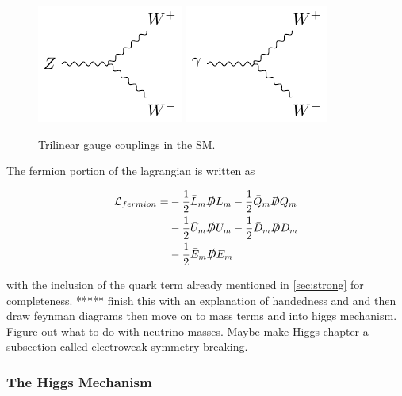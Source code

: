\begin{centering}
\begin{figure}[!hbt]
\myfloatalign
\includegraphics[width=.45\linewidth]{feynman/tlgc_z.pdf}
\includegraphics[width=.45\linewidth]{feynman/tlgc_g.pdf}
\caption{Trilinear gauge couplings in the \ac{SM}.}
\label{fig:tlgc}
\end{figure}
\end{centering}

The fermion portion of the lagrangian is written as

\begin{equation}
\begin{split}
\mathcal{L}_{fermion} = & -\frac{1}{2}\bar{L}_m\slashed{D}L_m -\frac{1}{2}\bar{Q}_m\slashed{D}Q_m \\
						& -\frac{1}{2}\bar{U}_m\slashed{D}U_m -\frac{1}{2}\bar{D}_m\slashed{D}D_m \\
						& -\frac{1}{2}\bar{E}_m\slashed{D}E_m \\
\end{split}
\end{equation}

with the inclusion of the quark term already mentioned in \autoref{sec:strong} for completeness. 
***** finish this with an explanation of handedness and and then draw feynman diagrams then move on to mass terms and into higgs mechanism. Figure out what to do with neutrino masses. Maybe make Higgs chapter a subsection called electroweak symmetry breaking. 


\subsubsection{The Higgs Mechanism}

